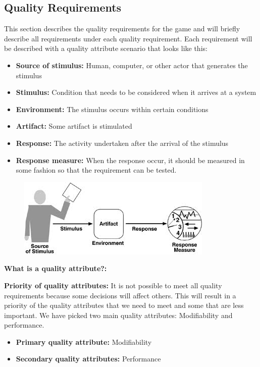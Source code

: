 \subsection{Quality Requirements}

This section describes the quality requirements for the game and will briefly describe all requirements under each quality requirement. Each requirement will be described with a quality attribute scenario that looks like this:

\begin{itemize}
	\item {\bf Source of stimulus:} Human, computer, or other actor that generates the stimulus
	\item {\bf Stimulus:} Condition that needs to be considered when it arrives at a system
	\item {\bf Environment:} The stimulus occurs within certain conditions
	\item {\bf Artifact:} Some artifact is stimulated 
	\item {\bf Response:} The activity undertaken after the arrival of the stimulus
	\item {\bf Response measure:} When the response occur, it should be measured in some fashion so that the requirement can be tested.
\end{itemize}

\begin{figure}[!hr]
	\includegraphics{pictures/qualityAttribute.jpg}
\end{figure}

{\bf What is a quality attribute?:}

{\bf Priority of quality attributes:} It is not possible to meet all quality requirements because some decisions will affect others. This will result in a priority of the quality attributes that we need to meet and some that are less important. We have picked two main quality attributes: Modifiability and performance.

\begin{itemize}
	\item {\bf Primary quality attribute: } Modifiability
	\item {\bf Secondary quality attributes: } Performance
\end{itemize}


